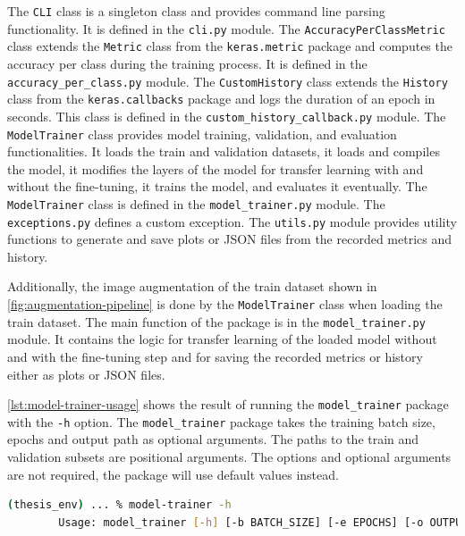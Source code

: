 \documentclass{BachelorBUI}
\begin{document}
        The \verb|CLI| class is a singleton class and provides command line parsing functionality. It is defined in the \verb|cli.py| module. The \verb|AccuracyPerClassMetric| class extends the \verb|Metric| class from the \verb|keras.metric| package and computes the accuracy per class during the training process. It is defined in the \verb|accuracy_per_class.py| module. The \verb|CustomHistory| class extends the \verb|History| class from the \verb|keras.callbacks| package and logs the duration of an epoch in seconds. This class is defined in the \verb|custom_history_callback.py| module. The \verb|ModelTrainer| class provides model training, validation, and evaluation functionalities. It loads the train and validation datasets, it loads and compiles the model, it modifies the layers of the model for transfer learning with and without the fine-tuning, it trains the model, and evaluates it eventually. The \verb|ModelTrainer| class is defined in the \verb|model_trainer.py| module. The \verb|exceptions.py| defines a custom exception. The \verb|utils.py| module provides utility functions to generate and save plots or JSON files from the recorded metrics and history.

        Additionally, the image augmentation of the train dataset shown in \autoref{fig:augmentation-pipeline} is done by the \verb|ModelTrainer| class when loading the train dataset. The main function of the package is in the \verb|model_trainer.py| module. It contains the logic for transfer learning of the loaded model without and with the fine-tuning step and for saving the recorded metrics or history either as plots or JSON files.

        \autoref{lst:model-trainer-usage} shows the result of running the \verb|model_trainer| package with the \verb|-h| option. The \verb|model_trainer| package takes the training batch size, epochs and output path as optional arguments. The paths to the train and validation subsets are positional arguments. The options and optional arguments are not required, the package will use default values instead.

        \begin{lstlisting}[language=bash, caption={\centering The usage of the model-trainer package}, label={lst:model-trainer-usage}, captionpos=b]
        (thesis_env) ... % model-trainer -h
        Usage: model_trainer [-h] [-b BATCH_SIZE] [-e EPOCHS] [-o OUTPUT] train_dataset_path validation_dataset_path
        \end{lstlisting}
\end{document}
